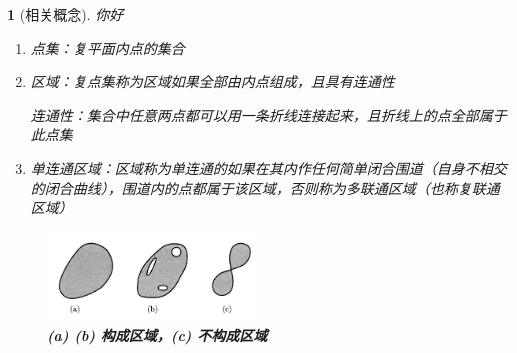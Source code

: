 \documentclass[zihao=5,UTF8]{report}
\theoremstyle{MyLineTheoremStyle} %
\theoremstyle{MyBlockTheoremStyle} %
\theoremstyle{MySubsubsectionStyle} %
\newtheorem{definition}{}
\begin{document}
\begin{definition}[相关概念]
你好
\begin{enumerate}
\item 点集：复平面内点的集合
\item 区域：复点集称为区域如果全部由内点组成，且具有连通性
{\par\color{gray}\small
连通性：集合中任意两点都可以用一条折线连接起来，且折线上的点全部属于此点集
\par}
\item 单连通区域：区域称为单连通的如果在其内作任何简单闭合围道（自身不相交的闭合曲线），围道内的点都属于该区域，否则称为多联通区域（也称复联通区域）
\end{enumerate}

\begin{figure}[H]\centering
\includegraphics[width=0.5\textwidth]{assets/4d651e08624250e2b6a287f557fe1cf8.png}
\caption{\textbf{(a) (b) 构成区域，(c) 不构成区域}}\label{(a) (b) 构成区域，(c) 不构成区域}
\end{figure}

\end{definition}


\nocite{*}

\thispagestyle{fancy} 
\end{document}
